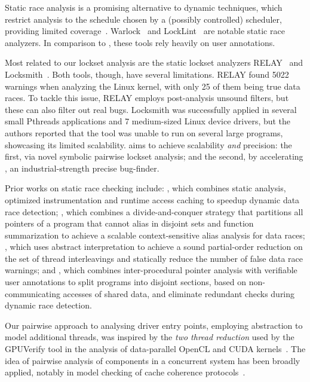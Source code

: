 Static race analysis is a promising alternative to dynamic techniques, which restrict analysis to the schedule chosen by a (possibly controlled) scheduler, providing limited coverage~\cite{musuvathi2008finding}. Warlock~\cite{sterling1993warlock} and LockLint~\cite{oracle2010locklint} are notable static race analyzers.  In comparison to \whoop, these tools rely heavily on user annotations.

Most related to our lockset analysis are the static lockset analyzers RELAY~\cite{voung2007relay} and Locksmith~\cite{pratikakis2006locksmith}. Both tools, though, have several limitations. RELAY found 5022 warnings when analyzing the Linux kernel, with only 25 of them being true data races. To tackle this issue, RELAY employs post-analysis unsound filters, but these can also filter out real bugs. Locksmith was successfully applied in several small Pthreads applications and 7 medium-sized Linux device drivers, but the authors reported that the tool was unable to run on several large programs, showcasing its limited scalability. \whoop aims to achieve scalability \emph{and} precision: the first, via novel symbolic pairwise lockset analysis; and the second, by accelerating \corral, an industrial-strength precise bug-finder.

Prior works on static race checking include: \cite{choi2002efficient}, which combines static analysis, optimized instrumentation and runtime access caching to speedup dynamic data race detection; \cite{kahlon2007fast}, which combines a divide-and-conquer strategy that partitions all pointers of a program that cannot alias in disjoint sets and function summarization to achieve a scalable context-sensitive alias analysis for data races; \cite{kahlon2009semantic}, which uses abstract interpretation to achieve a sound partial-order reduction on the set of thread interleavings and statically reduce the number of false data race warnings; and \cite{das2015section}, which combines inter-procedural pointer analysis with verifiable user annotations to split programs into disjoint sections, based on non-communicating accesses of shared data, and eliminate redundant checks during dynamic race detection.

Our pairwise approach to analysing driver entry points, employing abstraction to model additional threads, was inspired by the \emph{two thread reduction} used by the GPUVerify tool in the analysis of data-parallel OpenCL and CUDA kernels~\cite{gpuverify,bardsley2014engineering}.  The idea of pairwise analysis of components in a concurrent system has been broadly applied, notably in model checking of cache coherence protocols~\cite{mcmillan1999verification}.
